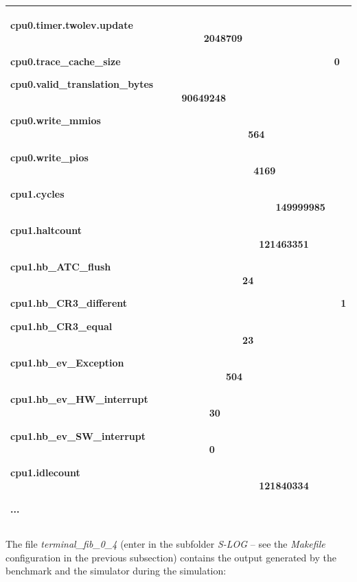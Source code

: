 \documentclass[a4paper]{article}
\begin{document}
\begin{flushleft}
\begin{tiny}
\begin{supertabular}{|m{6.34626in}|}
{\ttfamily cpu0.timer.twolev.update
\ \ \ \ \ \ \ \ \ \ \ \ \ \ \ \ \ \ \ \ \ \ \ \ \ \ \ \ \ \ \ \ \ \ \ 2048709}

{\ttfamily cpu0.trace\_cache\_size
\ \ \ \ \ \ \ \ \ \ \ \ \ \ \ \ \ \ \ \ \ \ \ \ \ \ \ \ \ \ \ \ \ \ \ \ \ \ 0}

{\ttfamily cpu0.valid\_translation\_bytes
\ \ \ \ \ \ \ \ \ \ \ \ \ \ \ \ \ \ \ \ \ \ \ \ \ \ \ \ \ \ \ 90649248}

{\ttfamily cpu0.write\_mmios
\ \ \ \ \ \ \ \ \ \ \ \ \ \ \ \ \ \ \ \ \ \ \ \ \ \ \ \ \ \ \ \ \ \ \ \ \ \ \ \ \ \ \ 564}

{\ttfamily cpu0.write\_pios
\ \ \ \ \ \ \ \ \ \ \ \ \ \ \ \ \ \ \ \ \ \ \ \ \ \ \ \ \ \ \ \ \ \ \ \ \ \ \ \ \ \ \ \ 4169}

{\ttfamily cpu1.cycles
\ \ \ \ \ \ \ \ \ \ \ \ \ \ \ \ \ \ \ \ \ \ \ \ \ \ \ \ \ \ \ \ \ \ \ \ \ \ \ \ \ \ \ \ \ \ \ \ 149999985}

{\ttfamily cpu1.haltcount
\ \ \ \ \ \ \ \ \ \ \ \ \ \ \ \ \ \ \ \ \ \ \ \ \ \ \ \ \ \ \ \ \ \ \ \ \ \ \ \ \ \ \ \ \ 121463351}

{\ttfamily cpu1.hb\_ATC\_flush
\ \ \ \ \ \ \ \ \ \ \ \ \ \ \ \ \ \ \ \ \ \ \ \ \ \ \ \ \ \ \ \ \ \ \ \ \ \ \ \ \ \ 24}

{\ttfamily cpu1.hb\_CR3\_different
\ \ \ \ \ \ \ \ \ \ \ \ \ \ \ \ \ \ \ \ \ \ \ \ \ \ \ \ \ \ \ \ \ \ \ \ \ \ 1}

{\ttfamily cpu1.hb\_CR3\_equal
\ \ \ \ \ \ \ \ \ \ \ \ \ \ \ \ \ \ \ \ \ \ \ \ \ \ \ \ \ \ \ \ \ \ \ \ \ \ \ \ \ \ 23}

{\ttfamily cpu1.hb\_ev\_Exception
\ \ \ \ \ \ \ \ \ \ \ \ \ \ \ \ \ \ \ \ \ \ \ \ \ \ \ \ \ \ \ \ \ \ \ \ \ \ \ 504}

{\ttfamily cpu1.hb\_ev\_HW\_interrupt
\ \ \ \ \ \ \ \ \ \ \ \ \ \ \ \ \ \ \ \ \ \ \ \ \ \ \ \ \ \ \ \ \ \ \ \ 30}

{\ttfamily cpu1.hb\_ev\_SW\_interrupt
\ \ \ \ \ \ \ \ \ \ \ \ \ \ \ \ \ \ \ \ \ \ \ \ \ \ \ \ \ \ \ \ \ \ \ \ 0}

{\ttfamily cpu1.idlecount
\ \ \ \ \ \ \ \ \ \ \ \ \ \ \ \ \ \ \ \ \ \ \ \ \ \ \ \ \ \ \ \ \ \ \ \ \ \ \ \ \ \ \ \ \ 121840334}

\ttfamily ...\\\hline
\end{supertabular}
\end{tiny}
\end{flushleft}
{
The file \textit{terminal\_fib\_0\_4 }(enter in the subfolder
\textit{S-LOG} -- see the \textit{Makefile} configuration in the
previous subsection) contains the output generated by the benchmark and
the simulator during the simulation:}
\end{document}
